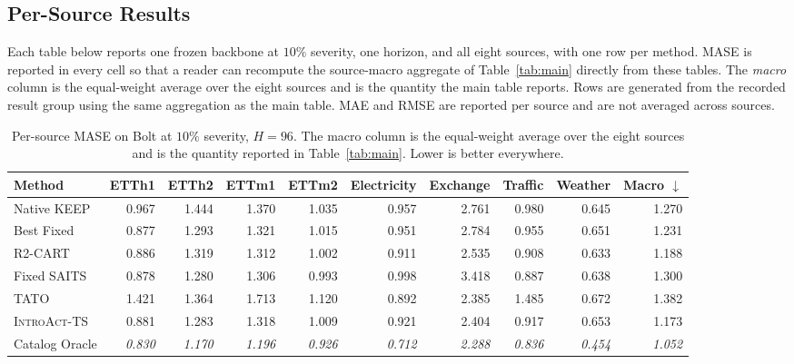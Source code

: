 \documentclass{article}
\newcommand{\oracle}[1]{\textit{\textcolor{phgray}{#1}}}
\newcommand{\introact}{\textsc{IntroAct-TS}}
\begin{document}
\subsection{Per-Source Results}
\label{app:datasets}
Each table below reports one frozen backbone at $10\%$ severity, one horizon, and
all eight sources, with one row per method. MASE is reported in every cell so that a
reader can recompute the source-macro aggregate of Table~\ref{tab:main} directly from
these tables. The \emph{macro} column is the equal-weight average over the eight sources
and is the quantity the main table reports. Rows are generated from the recorded result
group using the same aggregation as the main table.
MAE and RMSE are reported per source and are not averaged across sources.

\begin{table}[htbp]
  \caption{Per-source MASE on Bolt at $10\%$ severity, $H=96$. The macro column is the
  equal-weight average over the eight sources and is the quantity reported in
  Table~\ref{tab:main}. Lower is better everywhere.}
  \label{tab:app-src-bolt-96}
  \centering
  \small
  \setlength{\tabcolsep}{3pt}
\begin{tabular*}{\textwidth}{@{\extracolsep{\fill}}lrrrrrrrrr@{}}
    \toprule
    Method & ETTh1 & ETTh2 & ETTm1 & ETTm2 & Electricity & Exchange & Traffic & Weather & Macro $\downarrow$ \\
    \midrule
    Native KEEP & 0.967 & 1.444 & 1.370 & 1.035 & 0.957 & 2.761 & 0.980 & 0.645 & 1.270 \\
    Best Fixed & 0.877 & 1.293 & 1.321 & 1.015 & 0.951 & 2.784 & 0.955 & 0.651 & 1.231 \\
    R2-CART & 0.886 & 1.319 & 1.312 & 1.002 & 0.911 & 2.535 & 0.908 & 0.633 & 1.188 \\
    Fixed SAITS & 0.878 & 1.280 & 1.306 & 0.993 & 0.998 & 3.418 & 0.887 & 0.638 & 1.300 \\
    TATO & 1.421 & 1.364 & 1.713 & 1.120 & 0.892 & 2.385 & 1.485 & 0.672 & 1.382 \\
    \midrule
    \rowcolor{bestgray}\introact{} & 0.881 & 1.283 & 1.318 & 1.009 & 0.921 & 2.404 & 0.917 & 0.653 & 1.173 \\
    \midrule
    Catalog Oracle & \oracle{0.830} & \oracle{1.170} & \oracle{1.196} & \oracle{0.926} & \oracle{0.712} & \oracle{2.288} & \oracle{0.836} & \oracle{0.454} & \oracle{1.052} \\
    \bottomrule
  \end{tabular*}
\end{table}
\end{document}
